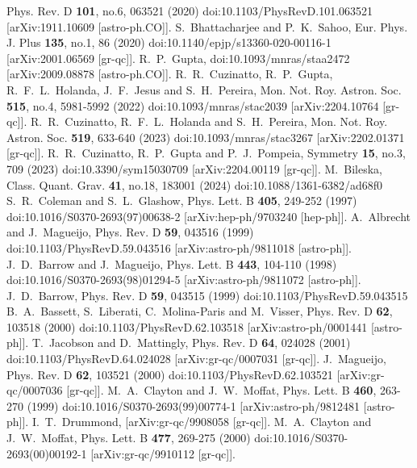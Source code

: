 \documentclass[jkps,preprint,fleqn]{revtex4}
\begin{document}
\begin{thebibliography}{999}
Phys. Rev. D \textbf{101}, no.6, 063521 (2020)
doi:10.1103/PhysRevD.101.063521
[arXiv:1911.10609 [astro-ph.CO]].
S.~Bhattacharjee and P.~K.~Sahoo,
Eur. Phys. J. Plus \textbf{135}, no.1, 86 (2020)
doi:10.1140/epjp/s13360-020-00116-1
[arXiv:2001.06569 [gr-qc]].
R.~P.~Gupta,
doi:10.1093/mnras/staa2472
[arXiv:2009.08878 [astro-ph.CO]].
R.~R.~Cuzinatto, R.~P.~Gupta, R.~F.~L.~Holanda, J.~F.~Jesus and S.~H.~Pereira,
Mon. Not. Roy. Astron. Soc. \textbf{515}, no.4, 5981-5992 (2022)
doi:10.1093/mnras/stac2039
[arXiv:2204.10764 [gr-qc]].
R.~R.~Cuzinatto, R.~F.~L.~Holanda and S.~H.~Pereira,
Mon. Not. Roy. Astron. Soc. \textbf{519}, 633-640 (2023)
doi:10.1093/mnras/stac3267
[arXiv:2202.01371 [gr-qc]].
R.~R.~Cuzinatto, R.~P.~Gupta and P.~J.~Pompeia,
Symmetry \textbf{15}, no.3, 709 (2023)
doi:10.3390/sym15030709
[arXiv:2204.00119 [gr-qc]].
M.~Bileska,
Class. Quant. Grav. \textbf{41}, no.18, 183001 (2024)
doi:10.1088/1361-6382/ad68f0
S.~R.~Coleman and S.~L.~Glashow,
Phys. Lett. B \textbf{405}, 249-252 (1997)
doi:10.1016/S0370-2693(97)00638-2
[arXiv:hep-ph/9703240 [hep-ph]].
A.~Albrecht and J.~Magueijo,
Phys. Rev. D \textbf{59}, 043516 (1999)
doi:10.1103/PhysRevD.59.043516
[arXiv:astro-ph/9811018 [astro-ph]].
J.~D.~Barrow and J.~Magueijo,
Phys. Lett. B \textbf{443}, 104-110 (1998)
doi:10.1016/S0370-2693(98)01294-5
[arXiv:astro-ph/9811072 [astro-ph]].
J.~D.~Barrow,
Phys. Rev. D \textbf{59}, 043515 (1999)
doi:10.1103/PhysRevD.59.043515
B.~A.~Bassett, S.~Liberati, C.~Molina-Paris and M.~Visser,
Phys. Rev. D \textbf{62}, 103518 (2000)
doi:10.1103/PhysRevD.62.103518
[arXiv:astro-ph/0001441 [astro-ph]].
T.~Jacobson and D.~Mattingly,
Phys. Rev. D \textbf{64}, 024028 (2001)
doi:10.1103/PhysRevD.64.024028
[arXiv:gr-qc/0007031 [gr-qc]].
J.~Magueijo,
Phys. Rev. D \textbf{62}, 103521 (2000)
doi:10.1103/PhysRevD.62.103521
[arXiv:gr-qc/0007036 [gr-qc]].
M.~A.~Clayton and J.~W.~Moffat,
Phys. Lett. B \textbf{460}, 263-270 (1999)
doi:10.1016/S0370-2693(99)00774-1
[arXiv:astro-ph/9812481 [astro-ph]].
I.~T.~Drummond,
[arXiv:gr-qc/9908058 [gr-qc]].
M.~A.~Clayton and J.~W.~Moffat,
Phys. Lett. B \textbf{477}, 269-275 (2000)
doi:10.1016/S0370-2693(00)00192-1
[arXiv:gr-qc/9910112 [gr-qc]].

\end{thebibliography}
\end{document}
